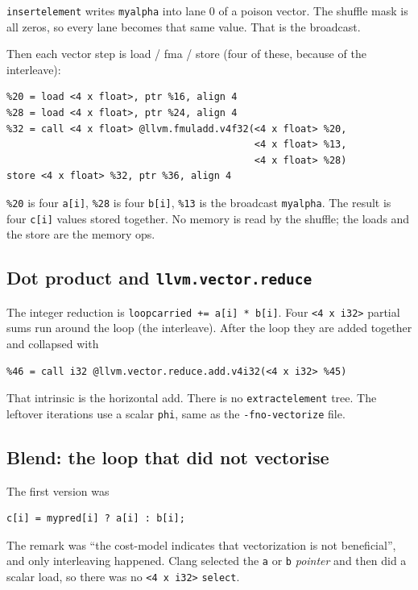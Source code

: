 \documentclass[11pt,a4paper]{article}
\begin{document}
\texttt{insertelement} writes \texttt{myalpha} into lane 0 of a poison
vector. The shuffle mask is all zeros, so every lane becomes that same
value. That is the broadcast.

Then each vector step is load / fma / store (four of these, because of
the interleave):

\begin{lstlisting}
%20 = load <4 x float>, ptr %16, align 4
%28 = load <4 x float>, ptr %24, align 4
%32 = call <4 x float> @llvm.fmuladd.v4f32(<4 x float> %20,
                                           <4 x float> %13,
                                           <4 x float> %28)
store <4 x float> %32, ptr %36, align 4
\end{lstlisting}

\texttt{\%20} is four \texttt{a[i]}, \texttt{\%28} is four \texttt{b[i]},
\texttt{\%13} is the broadcast \texttt{myalpha}. The result is four
\texttt{c[i]} values stored together. No memory is read by the shuffle;
the loads and the store are the memory ops.

\subsection*{Dot product and \texttt{llvm.vector.reduce}}

The integer reduction is \texttt{loopcarried += a[i] * b[i]}. Four
\texttt{<4 x i32>} partial sums run around the loop (the interleave).
After the loop they are added together and collapsed with

\begin{lstlisting}
%46 = call i32 @llvm.vector.reduce.add.v4i32(<4 x i32> %45)
\end{lstlisting}

That intrinsic is the horizontal add. There is no
\texttt{extractelement} tree. The leftover iterations use a scalar
\texttt{phi}, same as the \texttt{-fno-vectorize} file.

\subsection*{Blend: the loop that did not vectorise}

The first version was

\begin{lstlisting}[language={}]
c[i] = mypred[i] ? a[i] : b[i];
\end{lstlisting}

The remark was ``the cost-model indicates that vectorization is not
beneficial'', and only interleaving happened. Clang selected the
\texttt{a} or \texttt{b} \emph{pointer} and then did a scalar load, so
there was no \texttt{<4 x i32>} \texttt{select}.
\end{document}
